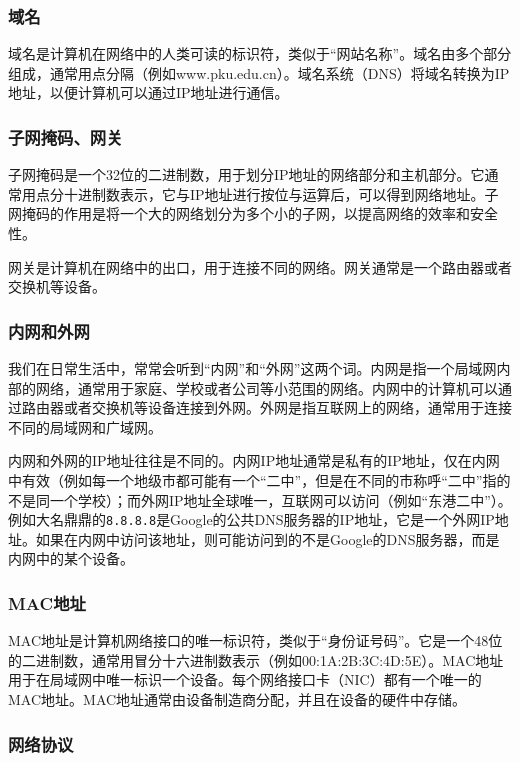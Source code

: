 \documentclass[../main.tex]{subfiles}
\begin{document}
\subsubsection{域名}
域名是计算机在网络中的人类可读的标识符，类似于“网站名称”。域名由多个部分组成，通常用点分隔（例如www.pku.edu.cn）。域名系统（DNS）将域名转换为IP地址，以便计算机可以通过IP地址进行通信。

\subsubsection{子网掩码、网关}

子网掩码是一个32位的二进制数，用于划分IP地址的网络部分和主机部分。它通常用点分十进制数表示，它与IP地址进行按位与运算后，可以得到网络地址。子网掩码的作用是将一个大的网络划分为多个小的子网，以提高网络的效率和安全性。

网关是计算机在网络中的出口，用于连接不同的网络。网关通常是一个路由器或者交换机等设备。

\subsubsection{内网和外网}

我们在日常生活中，常常会听到“内网”和“外网”这两个词。内网是指一个局域网内部的网络，通常用于家庭、学校或者公司等小范围的网络。内网中的计算机可以通过路由器或者交换机等设备连接到外网。外网是指互联网上的网络，通常用于连接不同的局域网和广域网。

内网和外网的IP地址往往是不同的。内网IP地址通常是私有的IP地址，仅在内网中有效（例如每一个地级市都可能有一个“二中”，但是在不同的市称呼“二中”指的不是同一个学校）；而外网IP地址全球唯一，互联网可以访问（例如“东港二中”）。例如大名鼎鼎的\texttt{8.8.8.8}是Google的公共DNS服务器的IP地址，它是一个外网IP地址。如果在内网中访问该地址，则可能访问到的不是Google的DNS服务器，而是内网中的某个设备。

\subsubsection{MAC地址}

MAC地址是计算机网络接口的唯一标识符，类似于“身份证号码”。它是一个48位的二进制数，通常用冒分十六进制数表示（例如00:1A:2B:3C:4D:5E）。MAC地址用于在局域网中唯一标识一个设备。每个网络接口卡（NIC）都有一个唯一的MAC地址。MAC地址通常由设备制造商分配，并且在设备的硬件中存储。

\subsubsection{网络协议}
\end{document}
